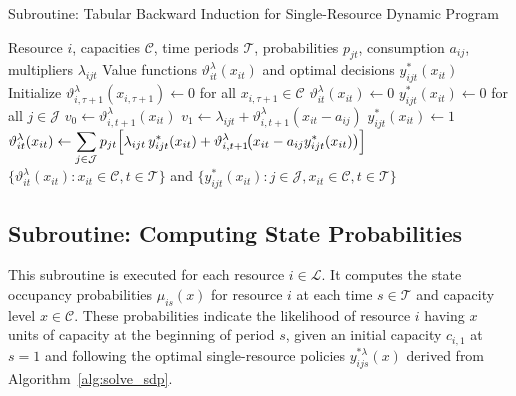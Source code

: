 \documentclass[11pt]{article}
\begin{document}
\begin{algorithm}[H]
\caption{Subroutine: Tabular Backward Induction for Single-Resource Dynamic Program}
\label{alg:solve_sdp}
\begin{algorithmic}[1]
\Require Resource $i$, capacities $\mathcal{C}$, time periods $\mathcal{T}$, probabilities $p_{jt}$, consumption $a_{ij}$, multipliers $\lambda_{ijt}$
\Ensure Value functions $\vartheta^\lambda_{it}(x_{it})$ and optimal decisions $y^*_{ijt}(x_{it})$
\State Initialize $\vartheta^\lambda_{i,\tau+1}(x_{i,\tau+1}) \gets 0$ for all $x_{i,\tau+1} \in \mathcal{C}$ 
 
     
        \State $\vartheta^\lambda_{it}(x_{it}) \gets 0$
        \State $y^*_{ijt}(x_{it}) \gets 0$ for all $j \in \mathcal{J}$ 
         
             
                \State $v_0 \gets \vartheta^\lambda_{i,t+1}(x_{it})$ 
                \State $v_1 \gets \lambda_{ijt} + \vartheta^\lambda_{i,t+1}(x_{it} - a_{ij})$ 
                    \State $y^*_{ijt}(x_{it}) \gets 1$ 
                \EndIf
            \EndIf
        \EndFor
        \State $\displaystyle \vartheta^\lambda_{it}(x_{it}) \gets \sum_{j\in\mathcal{J}} p_{jt}\Bigl[ \lambda_{ijt}\,y^*_{ijt}(x_{it}) + \vartheta^\lambda_{i,t+1}\!\bigl(x_{it}-a_{ij}y^*_{ijt}(x_{it})\bigr) \Bigr]$
    \EndFor
\EndFor
\State \Return $\{\vartheta^\lambda_{it}(x_{it}): x_{it} \in \mathcal{C}, t \in \mathcal{T}\}$ and $\{y^*_{ijt}(x_{it}): j \in \mathcal{J}, x_{it} \in \mathcal{C}, t \in \mathcal{T}\}$
\end{algorithmic}
\end{algorithm}

\vspace{0.5cm}



\subsection{Subroutine: Computing State Probabilities}

\noindent
This subroutine is executed for each resource $i \in \mathcal{L}$. 
It computes the state occupancy probabilities $\mu_{is}(x)$ for resource $i$ at each time $s \in \mathcal{T}$ and capacity level $x \in \mathcal{C}$. 
These probabilities indicate the likelihood of resource $i$ having $x$ units of capacity at the beginning of period $s$, given an initial capacity $c_{i,1}$ at $s=1$ and following the optimal single-resource policies $y^{*\lambda}_{ijs}(x)$ derived from Algorithm~\ref{alg:solve_sdp}.
\end{document}
